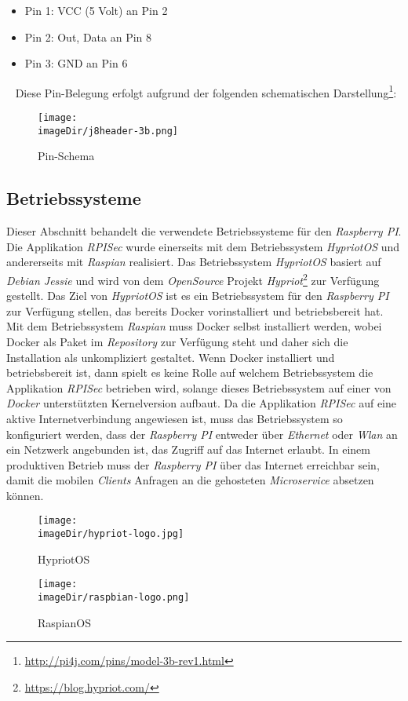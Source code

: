 \begin{itemize}
	\item Pin 1: VCC (5 Volt) an Pin 2
	\item Pin 2: Out, Data an Pin 8
	\item Pin 3: GND an Pin 6
\end{itemize}
\ \newline
Diese Pin-Belegung erfolgt aufgrund der folgenden schematischen Darstellung\footnote{\url{http://pi4j.com/pins/model-3b-rev1.html}}:

\begin{figure}[h]
	\centering
	\texttt{[image: \\imageDir/j8header-3b.png]}
	\caption{Pin-Schema}
	\label{fig:j8header-3b}
\end{figure}
\newpage

\subsection{Betriebssysteme}
Dieser Abschnitt behandelt die verwendete Betriebssysteme für den \emph{Raspberry PI}. Die Applikation \emph{RPISec} wurde einerseits mit dem Betriebssystem \emph{HypriotOS} und andererseits mit \emph{Raspian} realisiert. Das Betriebssystem \emph{HypriotOS} basiert auf \emph{Debian Jessie} und wird von dem \emph{OpenSource} Projekt \emph{Hypriot}\footnote{\url{https://blog.hypriot.com/}} zur Verfügung gestellt. Das Ziel von \emph{HypriotOS} ist es ein Betriebssystem für den \emph{Raspberry PI} zur Verfügung stellen, das bereits Docker vorinstalliert und betriebsbereit hat. Mit dem Betriebssystem \emph{Raspian} muss Docker selbst installiert werden, wobei Docker als Paket im \emph{Repository} zur Verfügung steht und daher sich die Installation als unkompliziert gestaltet.
\newline
\newline
Wenn Docker installiert und betriebsbereit ist, dann spielt es keine Rolle auf welchem Betriebssystem die Applikation \emph{RPISec} betrieben wird, solange dieses Betriebssystem auf einer von \emph{Docker} unterstützten Kernelversion aufbaut.
\newline
\newline
Da die Applikation \emph{RPISec} auf eine aktive Internetverbindung angewiesen ist, muss das Betriebssystem so konfiguriert werden, dass der \emph{Raspberry PI} entweder über \emph{Ethernet} oder \emph{Wlan} an ein Netzwerk angebunden ist, das Zugriff auf das Internet erlaubt. In einem produktiven Betrieb muss der \emph{Raspberry PI} über das Internet erreichbar sein, damit die mobilen \emph{Clients} Anfragen an die gehosteten \emph{Microservice} absetzen können.
\begin{figure}[h]
	\centering
	\texttt{[image: \\imageDir/hypriot-logo.jpg]}
	\caption{HypriotOS}
	\label{fig:HypriotOS}
\end{figure}\begin{figure}[h]
	\centering
	\texttt{[image: \\imageDir/raspbian-logo.png]}
	\caption{RaspianOS}
	\label{fig:RaspianOS}
\end{figure}